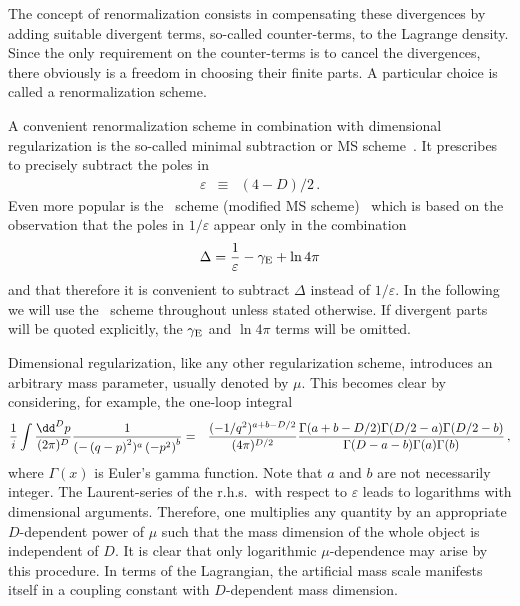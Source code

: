 The concept of renormalization consists in compensating these
divergences by adding suitable divergent terms, so-called counter-terms,
to the Lagrange density. Since the only requirement on
the counter-terms is to cancel the divergences, there obviously is a
freedom in choosing their finite parts. A particular choice is called
a renormalization scheme.

A convenient renormalization scheme in combination with dimensional
regularization is the so-called minimal subtraction or
MS scheme~\cite{tHo73}.  It prescribes to precisely subtract the poles in
\begin{eqnarray}
\varepsilon &\equiv& (4-D)/2\,.
\end{eqnarray}
Even more popular is the
\msbar~scheme (modified MS scheme)~\cite{BarBurDukMut78} which is
based on the observation that the poles in $1/\varepsilon$
appear only in the combination
\begin{equation}
\Delta = {1\over \varepsilon} - \gamma_{\rm E} + \ln 4\pi
\end{equation}
and that therefore it is convenient to subtract $\Delta$ instead of
$1/\varepsilon$. In the following we will use the \msbar~scheme throughout
unless stated otherwise. If divergent parts will be quoted explicitly,
the $\gamma_{\rm E}$ and $\ln 4\pi$ terms will be omitted.

Dimensional regularization, like any other regularization
scheme, introduces an arbitrary mass parameter, usually denoted
by $\mu$. This becomes clear by considering, for example, the
one-loop integral
\begin{eqnarray}
  \frac{1}{i}\int {\dd^Dp\over (2\pi)^D} 
  {1\over  (-\left(q-p\right)^2)^a 
           \left(-p^2\right)^b} &=& {(-1/q^2)^{a+b-D/2}\over (4\pi)^{D/2}}
  \frac{\Gamma(a+b-D/2)\Gamma(D/2-a)\Gamma(D/2-b)}
       {\Gamma(D-a-b)\Gamma(a)\Gamma(b)}
\,,
\label{eqml1loop}
\end{eqnarray}
where $\Gamma(x)$ is Euler's gamma function. Note that $a$
and $b$ are not necessarily integer.
The Laurent-series of the r.h.s.\ with respect to $\varepsilon$
leads to logarithms with dimensional arguments. Therefore, one multiplies
any quantity by an appropriate $D$-dependent power of $\mu$ such that
the mass dimension of the whole object is independent of $D$. It is clear
that only logarithmic $\mu$-dependence may arise by this procedure.
In terms of the Lagrangian, the artificial mass scale manifests itself
in a coupling constant with $D$-dependent mass dimension.

